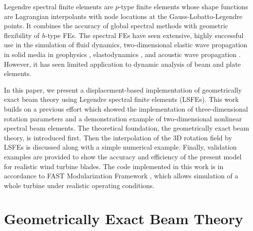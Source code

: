 \documentclass{aiaa-tc}
\begin{document}
Legendre spectral finite elements\cite{Patera:1984,Ronquist:1987} are
$p$-type finite elements whose shape functions are Lagrangian interpolants
with node locations at the Gauss-Lobatto-Legendre points. It combines the
accuracy of global spectral methods with geometric flexibility of {\it
h}-type FEs. The spectral FEs have seen extensive, highly successful use in
the simulation of fluid dynamics\cite{Ronquist:1987, Patera:1984,
Deville:2002}, two-dimensional elastic wave propagation in solid media in
geophysics \cite{Komatitsch:1998}, elastodynamics \cite{Sridhar:2006}, and
acoustic wave propagation \cite{Sprague:2004}. However, it has seen limited
application to dynamic analysis of
beam\cite{Ben-Tal-etal:1995,Ben-Tal-etal:1996,Kudela-etal:2007a,Sprague-Geers:2008}
and plate
elements\cite{Zrahia-Bar-Yoseph:1995,Kudela-etal:2007b,Sprague-Brito:2012}. 

In this paper, we present a displacement-based implementation of
geometrically exact beam theory using Legendre spectral finite elements
(LSFEs).  This work builds on a previous effort which showed the
implementation of three-dimensional rotation parameters\cite{Wang:GEBT2013}
and a demonstration example of two-dimensional nonlinear spectral beam
elements\cite{Wang:SFE2013}. The theoretical foundation, the geometrically
exact beam theory, is introduced first. Then the interpolation of the 3D
rotation field by LSFEs is discussed along with a simple numerical example.
Finally, validation examples are provided to show the accuracy and
efficiency of the present model for realistic wind turbine blades. The code
implemented in this work is in accordance to FAST Modularization Framework
\cite{Jonkman:2013},  which allows simulation of a whole turbine under
realistic operating conditions.

\section{Geometrically Exact Beam Theory}
\end{document}
